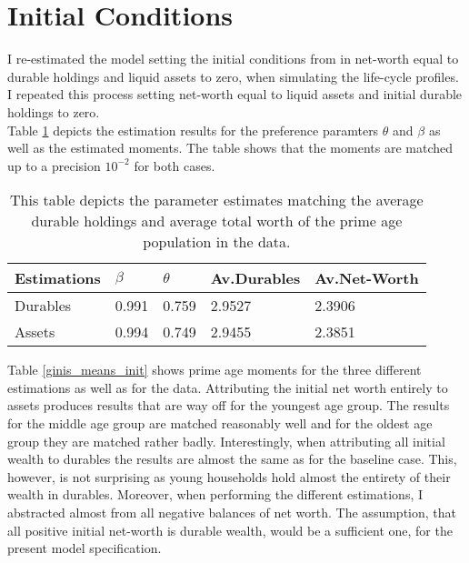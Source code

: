 \documentclass[12pt,a4paper,leqno]{article}
\theoremstyle{definition}
\begin{document}
\section{Initial Conditions}
\label{initial_conditions}

I re-estimated the model setting the initial conditions from \cite{hintermaier2011} in net-worth equal to durable holdings and liquid assets to zero, when simulating the life-cycle profiles. I repeated this process setting net-worth equal to liquid assets and initial durable holdings to zero.\\
Table \ref{estimates_initial_cond} depicts the estimation results for the preference paramters $\theta$ and $\beta$ as well as the estimated moments. The table shows that the moments are matched up to a precision $10^{-2}$ for both cases. 

\begin{table}[!htbp]
\centering
\caption{This table depicts the parameter estimates matching the average durable holdings and average total worth of the prime age population in the data.}
\label{estimates_initial_cond}
\begin{tabular}{llllll}
\hline
\multicolumn{2}{l}{Estimations} & $\beta$ & $\theta$ & Av.Durables & Av.Net-Worth\\ \hline
\multicolumn{2}{l}{Durables}             & 0.991    & 0.759  & 2.9527 & 2.3906      \\
\multicolumn{2}{l}{Assets}            & 0.994   & 0.749   & 2.9455 & 2.3851    
\end{tabular}
\end{table}

Table \ref{ginis_means_init} shows prime age moments for the three different estimations as well as for the data. Attributing the initial net worth entirely to assets produces results that are way off for the youngest age group. The results for the middle age group are matched reasonably well and for the oldest age group they are matched rather badly. Interestingly, when attributing all initial wealth to durables the results are almost the same as for the baseline case. This, however, is not surprising as young households hold almost the entirety of their wealth in durables. Moreover, when performing the different estimations, I abstracted almost from all negative balances of net worth. 
The assumption, that all positive initial net-worth is durable wealth, would be a sufficient one, for the present model specification. 
\end{document}
